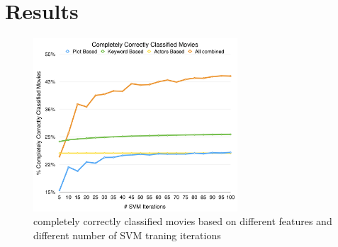 \documentclass{vldb}
\begin{document}
\section{Results}

\begin{figure}
\begin{center}
\includegraphics[width=3.00in]{CCCM.png}
\caption{completely correctly classified movies based on different features and different number of SVM traning iterations}
\label{fig:CCCM}
\end{center}
\end{figure}
\end{document}
